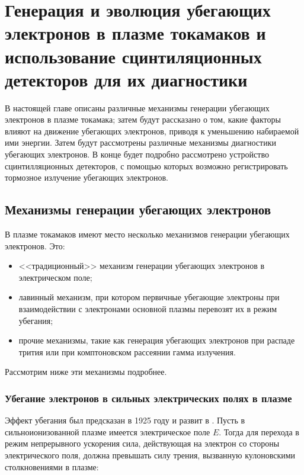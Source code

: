 

\chapter{Генерация и эволюция убегающих электронов в плазме токамаков и использование сцинтиляционных детекторов для их диагностики}
\label{ch:ch1}

В настоящей главе описаны различные механизмы генерации убегающих электронов в плазме токамака; затем будут рассказано о том, какие факторы влияют на движение убегающих электронов, приводя к уменьшению набираемой ими энергии. Затем будут рассмотрены различные механизмы диагностики убегающих электронов. В конце будет подробно рассмотрено устройство сцинтилляционных детекторов, с помощью которых возможно регистрировать тормозное излучение убегающих электронов. 


\section{Механизмы генерации убегающих электронов}
\label{sec:electronsGeneration}

В плазме токамаков имеют место несколько механизмов генерации убегающих электронов. Это:

\begin{itemize}
  \item <<традиционный>> механизм генерации убегающих электронов в электрическом поле;
  \item лавинный механизм, при котором первичные убегающие электроны при взаимодействии с электронами основной плазмы перевозят их в режим убегания;
  \item прочие механизмы, такие как генерация убегающих электронов при распаде трития или при комптоновском рассеянии гамма излучения.
\end{itemize}

Рассмотрим ниже эти механизмы подробнее.


\subsection{Убегание электронов в сильных электрических полях в плазме}

Эффект убегания был предсказан в 1925 году \cite{Wilson1925} и развит в \cite{Dreicer1959}. Пусть в сильноионизованной плазме имеется электрическое поле $E$. Тогда для перехода в режим непрерывного ускорения сила, действующая на электрон со стороны электрического поля, должна превышать силу трения, вызванную кулоновскими столкновениями в плазме:

